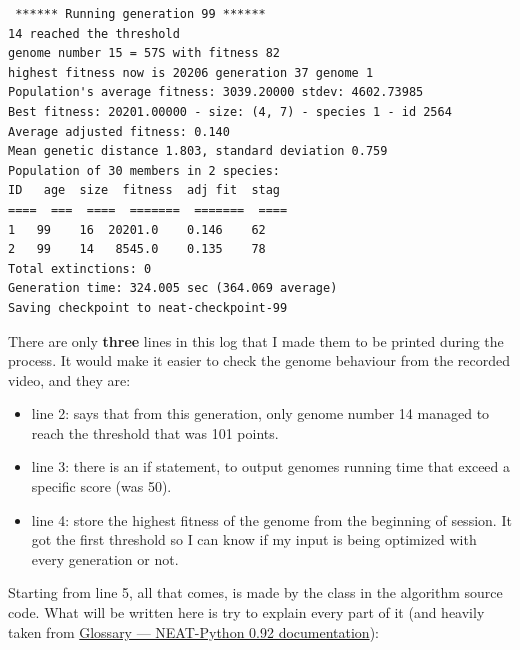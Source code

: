\begin{listing}[H]
\begin{verbatim}
 ****** Running generation 99 ****** 
14 reached the threshold
genome number 15 = 57S with fitness 82
highest fitness now is 20206 generation 37 genome 1
Population's average fitness: 3039.20000 stdev: 4602.73985
Best fitness: 20201.00000 - size: (4, 7) - species 1 - id 2564
Average adjusted fitness: 0.140
Mean genetic distance 1.803, standard deviation 0.759
Population of 30 members in 2 species:
ID   age  size  fitness  adj fit  stag
====  ===  ====  =======  =======  ====
1   99    16  20201.0    0.146    62
2   99    14   8545.0    0.135    78
Total extinctions: 0
Generation time: 324.005 sec (364.069 average)
Saving checkpoint to neat-checkpoint-99
\end{verbatim}
\end{listing}
 There are only \textbf{three} lines in this log that I made them to be printed during the process. It would make it easier to check the genome behaviour from the recorded video, and they are:
 \begin{itemize}
\item line 2: says that from this generation, only genome number 14 managed to reach the threshold that was 101 points.
\item line 3: there is an if statement, to output genomes running time that exceed a specific score (was 50).
\item line 4: store the highest fitness of the genome from the beginning of session. It got the first threshold so I can know if my input is being optimized with every generation or not.
 \end{itemize}

Starting from line 5, all that comes, is made by the  class in the algorithm source code. What will be written here is try to explain every part of it (and heavily taken from \href{https://neat-python.readthedocs.io/en/latest/glossary.html}{Glossary — NEAT-Python 0.92 documentation}):


